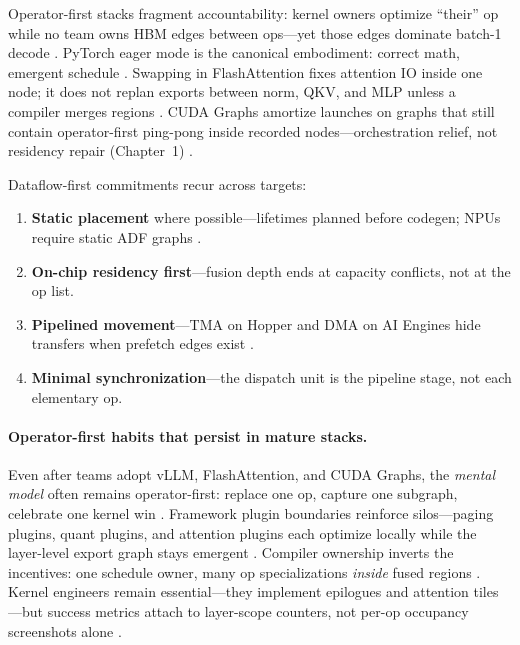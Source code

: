 Operator-first stacks fragment accountability: kernel owners optimize ``their'' op while no team owns HBM edges between ops---yet those edges dominate batch-1 decode \citep{patel2025llminference}.
PyTorch eager mode is the canonical embodiment: correct math, emergent schedule \citep{kwon2023vllm}.
Swapping in FlashAttention fixes attention IO inside one node; it does not replan exports between norm, QKV, and MLP unless a compiler merges regions \citep{dao2022flashattention}.
CUDA Graphs amortize launches on graphs that still contain operator-first ping-pong inside recorded nodes---orchestration relief, not residency repair (Chapter~1) \citep{nvidia2024cudagraphs}.

Dataflow-first commitments recur across targets:
\begin{enumerate}
\item \textbf{Static placement} where possible---lifetimes planned before codegen; NPUs require static ADF graphs \citep{amd2024xdna}.
\item \textbf{On-chip residency first}---fusion depth ends at capacity conflicts, not at the op list.
\item \textbf{Pipelined movement}---TMA on Hopper and DMA on AI Engines hide transfers when prefetch edges exist \citep{nvidia2022hopper,amd2024aie}.
\item \textbf{Minimal synchronization}---the dispatch unit is the pipeline stage, not each elementary op.
\end{enumerate}

\paragraph{Operator-first habits that persist in mature stacks.}
Even after teams adopt vLLM, FlashAttention, and CUDA Graphs, the \emph{mental model} often remains operator-first: replace one op, capture one subgraph, celebrate one kernel win \citep{kwon2023vllm,dao2022flashattention,nvidia2024cudagraphs}.
Framework plugin boundaries reinforce silos---paging plugins, quant plugins, and attention plugins each optimize locally while the layer-level export graph stays emergent \citep{patel2025llminference}.
Compiler ownership inverts the incentives: one schedule owner, many op specializations \emph{inside} fused regions \citep{yirage2026,chen2020compilerbasedhardw}.
Kernel engineers remain essential---they implement epilogues and attention tiles---but success metrics attach to layer-scope counters, not per-op occupancy screenshots alone \citep{taxbreak2026}.

